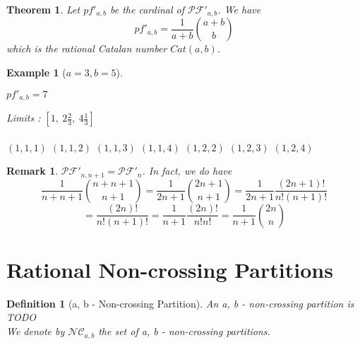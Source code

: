 \documentclass[12pt]{report}
\newtheorem{theorem}{Theorem}
\newtheorem{definition}{Definition}
\newtheorem*{example}{Example}
\newtheorem*{rem}{Remark}
\begin{document}
\begin{theorem}
    Let $pf'_{a,b}$ be the cardinal of
    $\mathcal{PF'}_{a,b}$.
    We have $$\displaystyle pf'_{a,b} = 
    \frac{1}{a + b} \binom{a + b}{b}$$
    which is the \emph{rational Catalan number}
    $Cat(a,b)$.
\end{theorem}

\begin{example}[$a = 3, b = 5$]
    ~\\
    \begin{itemize*}
        \item $pf'_{a,b} = 7$
        \item Limits : $[1,\ 2 \frac{2}{3},\ 
            4 \frac{1}{3}]$\\\\
        \subitem $(1, 1, 1)$
        \subitem $(1, 1, 2)$
        \subitem $(1, 1, 3)$
        \subitem $(1, 1, 4)$
        \subitem $(1, 2, 2)$
        \subitem $(1, 2, 3)$
        \subitem $(1, 2, 4)$
    \end{itemize*}    
\end{example}

\begin{rem}
    $\mathcal{PF'}_{n,n+1} = \mathcal{PF'}_n$.
    In fact, we do have
    $$\frac{1}{n + n + 1} \binom{n + n + 1}{n + 1}
    = \frac{1}{2n + 1} \binom {2n + 1}{n + 1}
    = \frac{1}{2n + 1} \frac{(2n + 1)!}{n ! (n+1)!}$$
    $$= \frac{(2n)!}{n!(n+1)!}
    = \frac{1}{n+1} \frac{(2n)!}{n!n!}
    = \frac{1}{n+1} \binom{2n}{n}$$
\end{rem}

\section{Rational Non-crossing Partitions}


\begin{definition}[a, b - Non-crossing Partition]
    An \emph{a, b - non-crossing partition} is
    TODO\\
    We denote by $\mathcal{NC}_{a,b}$ the set of 
    a, b - non-crossing partitions.
\end{definition}
\end{document}
